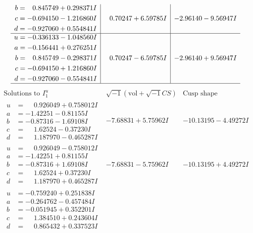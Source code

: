 \documentclass[1p]{elsarticle_modified}
\theoremstyle{definition}
\newcommand{\I}{\sqrt{-1}}
\begin{document}
$$\begin{array}{c|c|c}
\begin{aligned}
b &= \phantom{-}0.845749 + 0.298371 I \\
c &= -0.694150 - 1.216860 I \\
d &= -0.927060 + 0.554841 I\end{aligned}
 & \phantom{-}0.70247 + 6.59785 I & -2.96140 - 9.56947 I \\ \hline\begin{aligned}
u &= -0.336133 - 1.048560 I \\
a &= -0.156441 + 0.276251 I \\
b &= \phantom{-}0.845749 - 0.298371 I \\
c &= -0.694150 + 1.216860 I \\
d &= -0.927060 - 0.554841 I\end{aligned}
 & \phantom{-}0.70247 - 6.59785 I & -2.96140 + 9.56947 I\\
 \hline 
 \end{array}$$\newpage$$\begin{array}{c|c|c}  
\text{Solutions to }I^u_{1}& \I (\text{vol} + \sqrt{-1}CS) & \text{Cusp shape}\\
 \hline 
\begin{aligned}
u &= \phantom{-}0.926049 + 0.758012 I \\
a &= -1.42251 - 0.81155 I \\
b &= -0.87316 - 1.69108 I \\
c &= \phantom{-}1.62524 - 0.37230 I \\
d &= \phantom{-}1.187970 - 0.465287 I\end{aligned}
 & -7.68831 + 5.75962 I & -10.13195 - 4.49272 I \\ \hline\begin{aligned}
u &= \phantom{-}0.926049 - 0.758012 I \\
a &= -1.42251 + 0.81155 I \\
b &= -0.87316 + 1.69108 I \\
c &= \phantom{-}1.62524 + 0.37230 I \\
d &= \phantom{-}1.187970 + 0.465287 I\end{aligned}
 & -7.68831 - 5.75962 I & -10.13195 + 4.49272 I \\ \hline\begin{aligned}
u &= -0.759240 + 0.251838 I \\
a &= -0.264762 - 0.457484 I \\
b &= -0.051945 + 0.352201 I \\
c &= \phantom{-}1.384510 + 0.243604 I \\
d &= \phantom{-}0.865432 + 0.337523 I\end{aligned}

\end{array}$$
\end{document}
